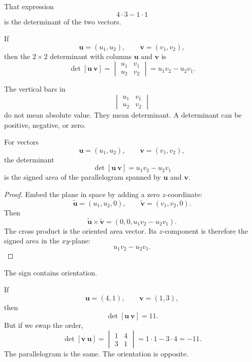 That expression
\[
    4\cdot3-1\cdot1
\]
is the determinant of the two vectors.

\begin{definition}
If
\[
    \mathbf u=(u_1,u_2),
    \qquad
    \mathbf v=(v_1,v_2),
\]
then the \(2\times2\) determinant with columns \(\mathbf u\) and \(\mathbf v\) is
\[
\boxed{
    \det[\mathbf u\ \mathbf v]
    =
    \begin{vmatrix}
        u_1 & v_1\\
        u_2 & v_2
    \end{vmatrix}
    =
    u_1v_2-u_2v_1.
}
\]
\end{definition}

The vertical bars in
\[
    \begin{vmatrix}
        u_1 & v_1\\
        u_2 & v_2
    \end{vmatrix}
\]
do not mean absolute value.  They mean determinant.  A determinant can be positive,
negative, or zero.

\begin{theorem}
For vectors
\[
    \mathbf u=(u_1,u_2),
    \qquad
    \mathbf v=(v_1,v_2),
\]
the determinant
\[
    \det[\mathbf u\ \mathbf v]
    =
    u_1v_2-u_2v_1
\]
is the signed area of the parallelogram spanned by \(\mathbf u\) and \(\mathbf v\).
\end{theorem}

\begin{proof}
Embed the plane in space by adding a zero \(z\)-coordinate:
\[
    \widetilde{\mathbf u}=(u_1,u_2,0),
    \qquad
    \widetilde{\mathbf v}=(v_1,v_2,0).
\]
Then
\[
    \widetilde{\mathbf u}\times\widetilde{\mathbf v}
    =
    (0,0,u_1v_2-u_2v_1).
\]
The cross product is the oriented area vector.  Its \(z\)-component is therefore the
signed area in the \(xy\)-plane:
\[
    u_1v_2-u_2v_1.
\]
\end{proof}

The sign contains orientation.

If
\[
    \mathbf u=(4,1),
    \qquad
    \mathbf v=(1,3),
\]
then
\[
    \det[\mathbf u\ \mathbf v]=11.
\]
But if we swap the order,
\[
    \det[\mathbf v\ \mathbf u]
    =
    \begin{vmatrix}
        1 & 4\\
        3 & 1
    \end{vmatrix}
    =
    1\cdot1-3\cdot4
    =
    -11.
\]
The parallelogram is the same.  The orientation is opposite.

